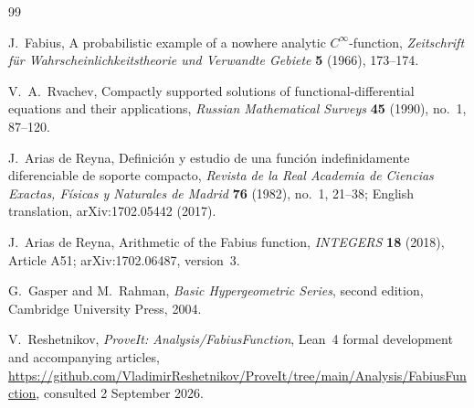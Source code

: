 \documentclass[11pt]{article}
\begin{document}
\begin{thebibliography}{99}

J.~Fabius,
\newblock A probabilistic example of a nowhere analytic $C^\infty$-function,
\newblock \emph{Zeitschrift f\"ur Wahrscheinlichkeitstheorie und Verwandte
Gebiete} \textbf{5} (1966), 173--174.

V.~A.~Rvachev,
\newblock Compactly supported solutions of functional-differential equations
and their applications,
\newblock \emph{Russian Mathematical Surveys} \textbf{45} (1990), no.~1,
87--120.

J.~Arias de Reyna,
\newblock Definici\'on y estudio de una funci\'on indefinidamente diferenciable
de soporte compacto,
\newblock \emph{Revista de la Real Academia de Ciencias Exactas, F\'isicas y
Naturales de Madrid} \textbf{76} (1982), no.~1, 21--38;
English translation, arXiv:1702.05442 (2017).

J.~Arias de Reyna,
\newblock Arithmetic of the Fabius function,
\newblock \emph{INTEGERS} \textbf{18} (2018), Article A51;
arXiv:1702.06487, version~3.

G.~Gasper and M.~Rahman,
\newblock \emph{Basic Hypergeometric Series}, second edition,
\newblock Cambridge University Press, 2004.

V.~Reshetnikov,
\newblock \emph{ProveIt: Analysis/FabiusFunction}, Lean~4 formal development
and accompanying articles,
\newblock \url{https://github.com/VladimirReshetnikov/ProveIt/tree/main/Analysis/FabiusFunction},
consulted 2 September 2026.

\end{thebibliography}
\end{document}
